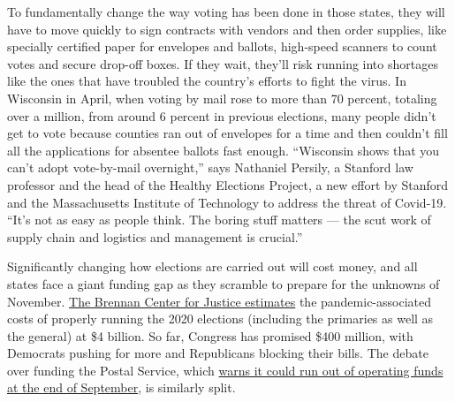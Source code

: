 To fundamentally change the way voting has been done in those states,
they will have to move quickly to sign contracts with vendors and then
order supplies, like specially certified paper for envelopes and
ballots, high-speed scanners to count votes and secure drop-off boxes.
If they wait, they'll risk running into shortages like the ones that
have troubled the country's efforts to fight the virus. In Wisconsin in
April, when voting by mail rose to more than 70 percent, totaling over a
million, from around 6 percent in previous elections, many people didn't
get to vote because counties ran out of envelopes for a time and then
couldn't fill all the applications for absentee ballots fast enough.
``Wisconsin shows that you can't adopt vote-by-mail overnight,'' says
Nathaniel Persily, a Stanford law professor and the head of the Healthy
Elections Project, a new effort by Stanford and the Massachusetts
Institute of Technology to address the threat of Covid-19. ``It's not as
easy as people think. The boring stuff matters --- the scut work of
supply chain and logistics and management is crucial.''

Significantly changing how elections are carried out will cost money,
and all states face a giant funding gap as they scramble to prepare for
the unknowns of November.
\href{https://www.brennancenter.org/our-work/research-reports/estimated-costs-covid-19-election-resiliency-measures}{The
Brennan Center for Justice estimates} the pandemic-associated costs of
properly running the 2020 elections (including the primaries as well as
the general) at \$4 billion. So far, Congress has promised \$400
million, with Democrats pushing for more and Republicans blocking their
bills. The debate over funding the Postal Service, which
\href{https://www.nytimes3xbfgragh.onion/2020/04/14/opinion/usps-coronavirus.html}{warns
it could run out of operating funds at the end of September}, is
similarly split.

